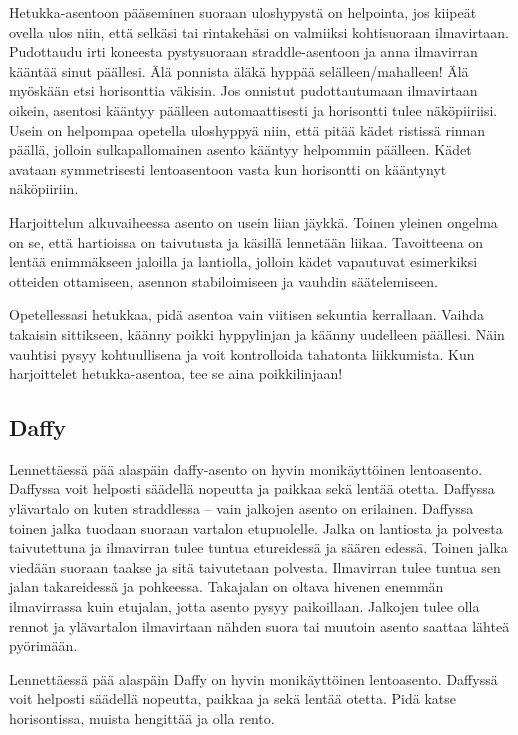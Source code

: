 Hetukka-asentoon pääseminen suoraan uloshypystä on helpointa, jos kiipeät ovella ulos niin, että selkäsi tai rintakehäsi on valmiiksi kohtisuoraan ilmavirtaan. Pudottaudu irti koneesta pystysuoraan straddle-asentoon ja anna ilmavirran kääntää sinut päällesi. Älä ponnista äläkä hyppää selälleen/mahalleen! Älä myöskään etsi horisonttia väkisin. Jos onnistut pudottautumaan ilmavirtaan oikein, asentosi kääntyy päälleen automaattisesti ja horisontti tulee näköpiiriisi. Usein on helpompaa opetella uloshyppyä niin, että pitää kädet ristissä rinnan päällä, jolloin sulkapallomainen asento kääntyy helpommin päälleen. Kädet avataan symmetrisesti lentoasentoon vasta kun horisontti on kääntynyt näköpiiriin. 


Harjoittelun alkuvaiheessa asento on usein liian jäykkä. Toinen yleinen ongelma on se, että hartioissa on taivutusta ja käsillä lennetään liikaa. Tavoitteena on lentää enimmäkseen jaloilla ja lantiolla, jolloin kädet vapautuvat esimerkiksi otteiden ottamiseen, asennon stabiloimiseen ja vauhdin säätelemiseen. 


Opetellessasi hetukkaa, pidä asentoa vain viitisen sekuntia kerrallaan. Vaihda takaisin sittikseen, käänny poikki hyppylinjan ja käänny uudelleen päällesi. Näin vauhtisi pysyy kohtuullisena ja voit kontrolloida tahatonta liikkumista. Kun harjoittelet hetukka-asentoa, tee se aina poikkilinjaan! 

\subsection{ Daffy }
\label{freefly-lentoasennot-daffy}


Lennettäessä pää alaspäin daffy-asento on hyvin monikäyttöinen lentoasento. Daffyssa voit helposti säädellä nopeutta ja paikkaa sekä lentää otetta. Daffyssa ylävartalo on kuten straddlessa – vain jalkojen asento on erilainen. Daffyssa toinen jalka tuodaan suoraan vartalon etupuolelle. Jalka on lantiosta ja polvesta taivutettuna ja ilmavirran tulee tuntua etureidessä ja säären edessä. Toinen jalka viedään suoraan taakse ja sitä taivutetaan polvesta. Ilmavirran tulee tuntua sen jalan takareidessä ja pohkeessa. Takajalan on oltava hivenen enemmän ilmavirrassa kuin etujalan, jotta asento pysyy paikoillaan. Jalkojen tulee olla rennot ja ylävartalon ilmavirtaan nähden suora tai muutoin asento saattaa lähteä pyörimään. 


Lennettäessä pää alaspäin Daffy on hyvin monikäyttöinen lentoasento. Daffyssä voit helposti säädellä nopeutta, paikkaa ja sekä lentää otetta. Pidä katse horisontissa, muista hengittää ja olla rento. 


